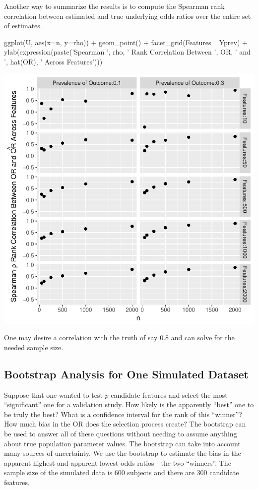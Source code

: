 Another way to summarize the results is to compute the Spearman rank correlation
between estimated and true underlying odds ratios over the entire set of 
estimates.
\begin{Schunk}
\begin{Sinput}
ggplot(U, aes(x=n, y=rho)) + geom_point() +
  facet_grid(Features ~ Yprev) +
  ylab(expression(paste('Spearman ', rho, ' Rank Correlation Between ',
                        OR, ' and ', hat(OR), ' Across Features')))
\end{Sinput}


\centerline{\includegraphics{hdata-simor-rho-1} }

\end{Schunk}
One may desire a correlation with the truth of say 0.8 and can solve
for the needed sample size.

\subsection{Bootstrap Analysis for One Simulated Dataset}
Suppose that one wanted to test $p$ candidate features and select the
most ``significant'' one for a validation study.  How likely is the
apparently ``best'' one to be truly the best?  What is a confidence
interval for the rank of this ``winner''?  How much bias in the OR
does the selection process create?  The bootstrap can be used to
answer all of these questions without needing to assume anything about
true population parameter values.  The bootstrap can take into account
many sources of uncertainty.  We use the bootstrap to estimate the
bias in the apparent highest and apparent lowest odds ratios---the two
``winners''.  The sample size of the simulated data is 600 subjects
and there are 300 candidate features.

